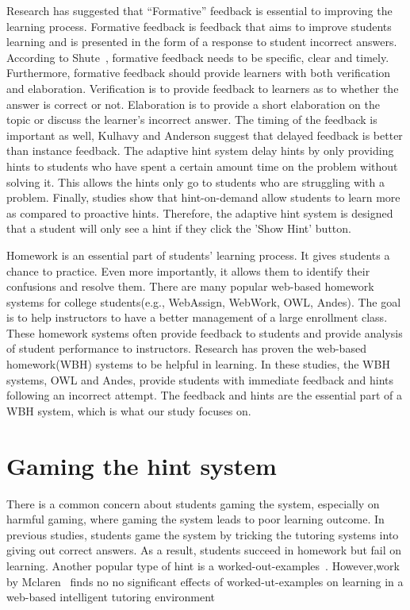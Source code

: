 \documentclass{llncs2e/llncs}
\begin{document}
Research has suggested that ``Formative'' feedback is essential to
improving the learning
process\cite{Azevedo1995}\cite{Bangert-Drowns1991}. Formative feedback
is feedback that aims to improve students learning and is presented in
the form of a response to student incorrect
answers\cite{Shute2008}. According to Shute~\cite{Shute2008},
formative feedback needs to be specific, clear and
timely. Furthermore, formative feedback should provide learners with
both verification and
elaboration\cite{Mason2001}\cite{Bangert-Drowns1991}. Verification is
to provide feedback to learners as to whether the answer is correct or
not. Elaboration is to provide a short elaboration on the topic or
discuss the learner's incorrect answer. The timing of the feedback is
important as well, Kulhavy and Anderson suggest that delayed feedback
is better than instance feedback\cite{Kulhavy1972}. The adaptive hint
system delay hints by only providing hints to students who have spent
a certain amount time on the problem without solving it. This allows
the hints only go to students who are struggling with a
problem. Finally, studies show that hint-on-demand allow students to
learn more as compared to proactive hints\cite{Razzaq2010}. Therefore,
the adaptive hint system is designed that a student will only see a
hint if they click the 'Show Hint' button.

Homework is an essential part of students' learning
process\cite{Cooper2006}. It gives students a chance to practice. Even
more importantly, it allows them to identify their confusions and
resolve them. There are many popular web-based homework systems for
college students(e.g., WebAssign, WebWork, OWL, Andes). The goal is to
help instructors to have a better management of a large enrollment
class. These homework systems often provide feedback to students and
provide analysis of student performance to instructors. Research has
proven the web-based homework(WBH) systems to be helpful in
learning\cite{MestHartRath2002}\cite{Vanlehn2005}. In these studies,
the WBH systems, OWL and Andes, provide students with immediate
feedback and hints following an incorrect
attempt\cite{MestHartRath2002}\cite{Vanlehn2005}. The feedback and
hints are the essential part of a WBH system, which is what our study
focuses on.

\section{Gaming the hint system}

There is a common concern about students gaming the system, especially
on harmful gaming, where gaming the system leads to poor learning
outcome\cite{Baker2004}\cite{Baker2005}. In previous studies, students
game the system by tricking the tutoring systems into giving out
correct answers\cite{Baker2004Off-task}. As a result, students succeed
in homework but fail on learning. Another popular type of hint is a
worked-out-examples~\cite{Atkinson2000}.  However,work by
Mclaren~\cite{McLaren2006} finds no no significant effects of
worked-ut-examples on learning in a web-based intelligent tutoring
environment
\end{document}
